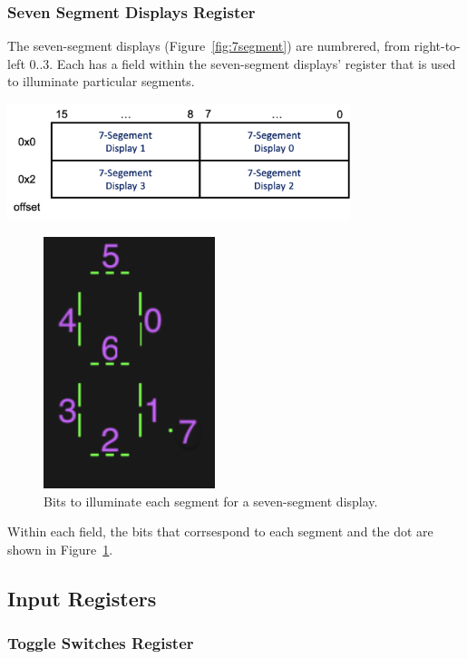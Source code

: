 \documentclass[12pt]{article}
\begin{document}
\subsubsection{Seven Segment Displays Register} \label{sec:7segment}

The seven-segment displays (Figure~\ref{fig:7segment}) are numbrered, from
right-to-left $0..3$. Each has a field within the seven-segment displays'
register that is used to illuminate particular segments.

\begin{center}
\includegraphics[width=10cm]{7segment-register}
\end{center}

\begin{figure}
    \centering
    \includegraphics[width=5cm]{7segment-bits}
    \caption{Bits to illuminate each segment for a seven-segment display.\label{fig:7segment-bits}}
\end{figure}

Within each field, the bits that corrsespond to each segment and the dot are
shown in Figure~\ref{fig:7segment-bits}.

\subsection{Input Registers}

\subsubsection{Toggle Switches Register} \label{sec:toggles}
\end{document}
